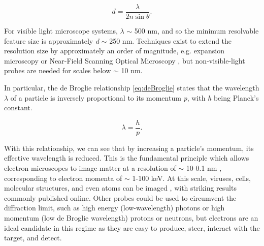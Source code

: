         \begin{equation}\label{eq:diffraction}
            d = \frac{\lambda}{2n\sin{\theta}}.
        \end{equation}
        
        For visible light microscope systems, $\lambda$ $\sim$ 500 nm, and so the minimum resolvable feature size is approximately \textit{d} $\sim$ 250 nm. Techniques exist to extend the resolution size by approximately an order of magnitude, e.g. expansion microscopy \parencite{Chen2015ExpansionMicroscopy} or Near-Field Scanning Optical Microscopy \parencite{Ma20216Source}, but non-visible-light probes are needed for scales below $\sim$ 10 nm. 

        

        In particular, the de Broglie relationship \ref{eq:deBroglie} \parencite{Broglie1924AQuanta} states that the wavelength $\lambda$ of a particle is inversely proportional to its momentum \textit{p}, with \textit{h} being Planck's constant. 
        
            \begin{equation}\label{eq:deBroglie}
               \lambda = \frac{h}{p}.
            \end{equation}

        With this relationship, we can see that by increasing a particle's momentum, its effective wavelength is reduced. This is the fundamental principle which allows electron microscopes to image matter at a resolution of $\sim$ 10-0.1 nm \parencite{Franken2020ADevelopments}, corresponding to electron momenta of $\sim$ 1-100 keV. At this scale, viruses, cells, molecular structures, and even atoms can be imaged \parencite{Williams2009TransmissionMicroscopy}, with striking results commonly published online. Other probes could be used to circumvent the diffraction limit, such as high energy (low-wavelength) photons or high momentum (low de Broglie wavelength) protons or neutrons, but electrons are an ideal candidate in this regime as they are easy to produce, steer, interact with the target, and detect. 

